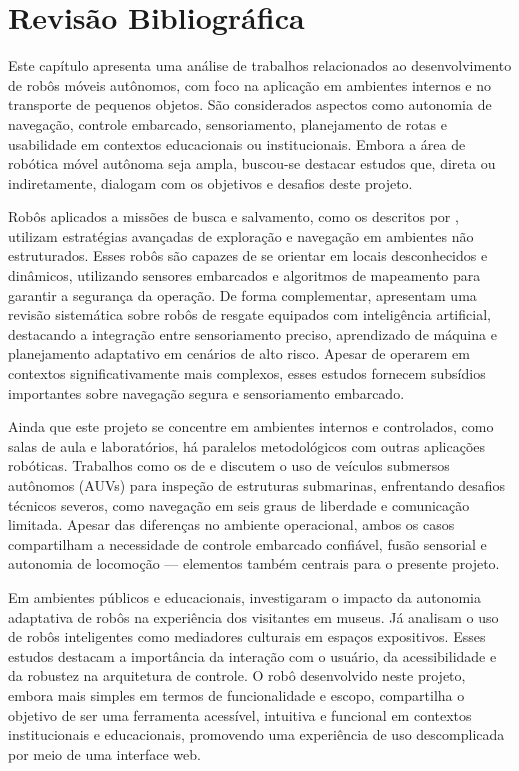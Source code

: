 \documentclass[	12pt, Times, openright, twoside, a4paper, english, brazil]{abntex2}
\begin{document}

\chapter{Revisão Bibliográfica}
\label{chap:revisao}

Este capítulo apresenta uma análise de trabalhos relacionados ao desenvolvimento de robôs móveis autônomos, com foco na aplicação em ambientes internos e no transporte de pequenos objetos. São considerados aspectos como autonomia de navegação, controle embarcado, sensoriamento, planejamento de rotas e usabilidade em contextos educacionais ou institucionais. Embora a área de robótica móvel autônoma seja ampla, buscou-se destacar estudos que, direta ou indiretamente, dialogam com os objetivos e desafios deste projeto.

Robôs aplicados a missões de busca e salvamento, como os descritos por , utilizam estratégias avançadas de exploração e navegação em ambientes não estruturados. Esses robôs são capazes de se orientar em locais desconhecidos e dinâmicos, utilizando sensores embarcados e algoritmos de mapeamento para garantir a segurança da operação. De forma complementar,  apresentam uma revisão sistemática sobre robôs de resgate equipados com inteligência artificial, destacando a integração entre sensoriamento preciso, aprendizado de máquina e planejamento adaptativo em cenários de alto risco. Apesar de operarem em contextos significativamente mais complexos, esses estudos fornecem subsídios importantes sobre navegação segura e sensoriamento embarcado.

Ainda que este projeto se concentre em ambientes internos e controlados, como salas de aula e laboratórios, há paralelos metodológicos com outras aplicações robóticas. Trabalhos como os de  e  discutem o uso de veículos submersos autônomos (AUVs) para inspeção de estruturas submarinas, enfrentando desafios técnicos severos, como navegação em seis graus de liberdade e comunicação limitada. Apesar das diferenças no ambiente operacional, ambos os casos compartilham a necessidade de controle embarcado confiável, fusão sensorial e autonomia de locomoção — elementos também centrais para o presente projeto.

Em ambientes públicos e educacionais,  investigaram o impacto da autonomia adaptativa de robôs na experiência dos visitantes em museus. Já  analisam o uso de robôs inteligentes como mediadores culturais em espaços expositivos. Esses estudos destacam a importância da interação com o usuário, da acessibilidade e da robustez na arquitetura de controle. O robô desenvolvido neste projeto, embora mais simples em termos de funcionalidade e escopo, compartilha o objetivo de ser uma ferramenta acessível, intuitiva e funcional em contextos institucionais e educacionais, promovendo uma experiência de uso descomplicada por meio de uma interface web.
\end{document}
